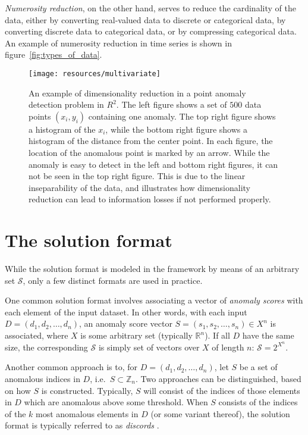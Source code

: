 \emph{Numerosity reduction}, on the other hand, serves to reduce the cardinality of the data, either by converting real-valued data to discrete or categorical data, by converting discrete data to categorical data, or by compressing categorical data. An example of numerosity reduction in time series is shown in figure~\ref{fig:types_of_data}.

\begin{figure}[htb]
\begin{center}
\leavevmode
\texttt{[image: resources/multivariate]}
\end{center}
\caption{\small{An example of dimensionality reduction in a point anomaly detection problem in $R^2$. The left figure shows a set of $500$ data points $(x_i, y_i)$ containing one anomaly. The top right figure shows a histogram of the $x_i$, while the bottom right figure shows a histogram of the distance from the center point. In each figure, the location of the anomalous point is marked by an arrow. While the anomaly is easy to detect in the left and bottom right figures, it can not be seen in the top right figure. This is due to the linear inseparability of the data, and illustrates how dimensionality reduction can lead to information losses if not performed properly.}}
\label{fig:dimensionality_reduction}
\end{figure}

\section{The solution format}

While the solution format is modeled in the framework by means of an arbitrary set $\mathcal{S}$, only a few distinct formats are used in practice.

One common solution format involves associating a vector of \emph{anomaly scores} with each element of the input dataset. In other words, with each input $D = (d_1, d_2, \dots, d_n)$, an anomaly score vector $S = (s_1, s_2, \dots, s_n) \in X^n$ is associated, where $X$ is some arbitrary set (typically $\mathbb{R}^n$). If all $D$ have the same size, the corresponding $\mathcal{S}$ is simply set of vectors over $X$ of length $n$: $\mathcal{S} = 2^{X^n}$.

Another common approach is to, for $D = (d_1, d_2, \dots, d_n)$, let $S$ be a set of anomalous indices in $D$, i.e.\ $S \subset \mathbb{Z}_n$. Two approaches can be distinguished, based on how $S$ is constructed. Typically, $S$ will consist of the indices of those elements in $D$ which are anomalous above some threshold. When $S$ consists of the indices of the $k$ most anomalous elements in $D$ (or some variant thereof), the solution format is typically referred to as \emph{discords} \cite{keogh1} \cite{bu} \cite{yankov} \cite{fu} \cite{lin}.

